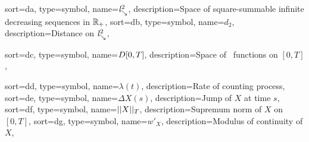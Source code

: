 {
	sort={da},
	type=symbol,
	name={$\mathit{l}^2_{\searrow}$},
	description={Space of square-summable infinite decreasing sequences in $\mathbb{R}_+$, \pageref{D: ld}}
}
{
	sort={db},
	type=symbol,
	name={$d_2$},
	description={Distance on $\mathit{l}^2_{\searrow}$, \pageref{D: ld}}
}

{
	sort={dc},
	type=symbol,
name={$D[0, T]$},
description={Space of \cadlag~functions on $[0,T]$, \pageref{D: DT}}
}

{
	sort={dd},
	type=symbol,
name={$\lambda(t)$},
description={Rate of counting process, \pageref{D: def gamma(A)}}
}
{
	sort={de},
	type=symbol,
name={$\Delta X(s)$},
description={Jump of $X$ at time $s$, \pageref{I: DeltaX}}
}
{
	sort={df},
	type=symbol,
name={$||X||_T$},
description={Supremum norm of $X$ on $[0,T]$, \pageref{I: supnorm}}
}
{
	sort={dg},
	type=symbol,
	name={$w'_X$},
	description={Modulus of continuity of $X$, \pageref{D: modulus of continuity}}
}

